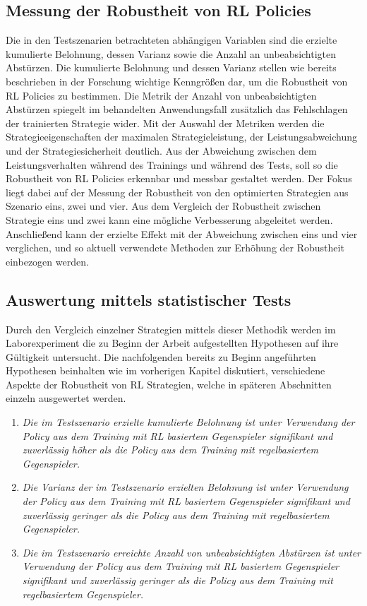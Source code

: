 \subsection{Messung der Robustheit von RL Policies}

Die in den Testszenarien betrachteten abhängigen Variablen sind die erzielte kumulierte Belohnung, dessen Varianz sowie die Anzahl an unbeabsichtigten Abstürzen.
Die kumulierte Belohnung und dessen Varianz stellen wie bereits beschrieben in der Forschung wichtige Kenngrößen dar, um die Robustheit von RL Policies zu bestimmen.
Die Metrik der Anzahl von unbeabsichtigten Abstürzen spiegelt im behandelten Anwendungsfall zusätzlich das Fehlschlagen der trainierten Strategie wider.
Mit der Auswahl der Metriken werden die Strategieeigenschaften der maximalen Strategieleistung, der Leistungsabweichung und der Strategiesicherheit deutlich.
Aus der Abweichung zwischen dem Leistungsverhalten während des Trainings und während des Tests, soll so die Robustheit von RL Policies erkennbar und messbar gestaltet werden.
Der Fokus liegt dabei auf der Messung der Robustheit von den optimierten Strategien aus Szenario eins, zwei und vier.
Aus dem Vergleich der Robustheit zwischen Strategie eins und zwei kann eine mögliche Verbesserung abgeleitet werden.
Anschließend kann der erzielte Effekt mit der Abweichung zwischen eins und vier verglichen, und so aktuell verwendete Methoden zur Erhöhung der Robustheit einbezogen werden.

\subsection{Auswertung mittels statistischer Tests}

Durch den Vergleich einzelner Strategien mittels dieser Methodik werden im Laborexperiment die zu Beginn der Arbeit aufgestellten Hypothesen auf ihre Gültigkeit untersucht.
Die nachfolgenden bereits zu Beginn angeführten Hypothesen beinhalten wie im vorherigen Kapitel diskutiert, verschiedene Aspekte der Robustheit von RL Strategien, welche in späteren Abschnitten einzeln ausgewertet werden.
\begin{enumerate}
    \item \textit{Die im Testszenario erzielte kumulierte Belohnung ist unter Verwendung der Policy aus dem Training mit RL basiertem Gegenspieler signifikant und zuverlässig höher als die Policy aus dem Training mit regelbasiertem Gegenspieler.}
    \item \textit{Die Varianz der im Testszenario erzielten Belohnung ist unter Verwendung der Policy aus dem Training mit RL basiertem Gegenspieler signifikant und zuverlässig geringer als die Policy aus dem Training mit regelbasiertem Gegenspieler.}
    \item \textit{Die im Testszenario erreichte Anzahl von unbeabsichtigten Abstürzen ist unter Verwendung der Policy aus dem Training mit RL basiertem Gegenspieler signifikant und zuverlässig geringer als die Policy aus dem Training mit regelbasiertem Gegenspieler.}
\end{enumerate}

